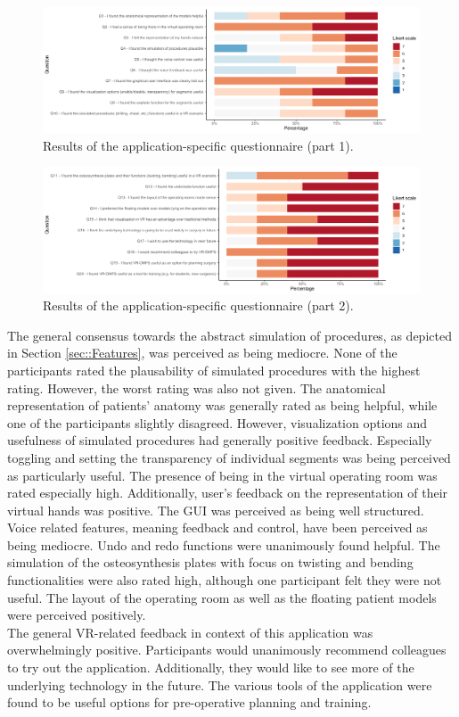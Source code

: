 \begin{figure}
    \centering
    \includegraphics[width=\linewidth]{images/evaluation/VR-SET1.png}
    \caption{\label{fig::vrSet1}Results of the application-specific questionnaire (part 1).}
\end{figure}

\begin{figure}
    \centering
    \includegraphics[width=\linewidth]{images/evaluation/VR-SET2.png}
    \caption{\label{fig::vrSet2}Results of the application-specific questionnaire (part 2).}
\end{figure}

The general consensus towards the abstract simulation of procedures,
as depicted in Section \ref{sec::Features}, was perceived as 
being mediocre. None of the participants rated the plausability
of simulated procedures with the highest rating.
However, the worst rating was also not given. The anatomical 
representation of patients' anatomy was generally rated as being
helpful, while one of the participants slightly disagreed. 
However, visualization options and usefulness of simulated procedures
had generally positive feedback. Especially toggling and setting the 
transparency of individual segments was being perceived as particularly
useful.
The presence of being in the virtual operating room was rated
especially high. Additionally, user's feedback on the representation
of their virtual hands was positive. 
The GUI was perceived as being well structured.
Voice related features, meaning feedback and control, have been
perceived as being mediocre. 
Undo and redo functions were unanimously found helpful.
The simulation of the osteosynthesis plates with focus on
twisting and bending functionalities were also rated high,
although one participant felt they were not useful.
The layout of the operating room as well as the floating patient
models were perceived positively. 
\\ The general VR-related feedback in context of this application
was overwhelmingly positive. 
Participants would unanimously recommend colleagues to try
out the application. Additionally, they would like to see
more of the underlying technology in the future.
The various tools of the application were found to be 
useful options for pre-operative planning and training.

